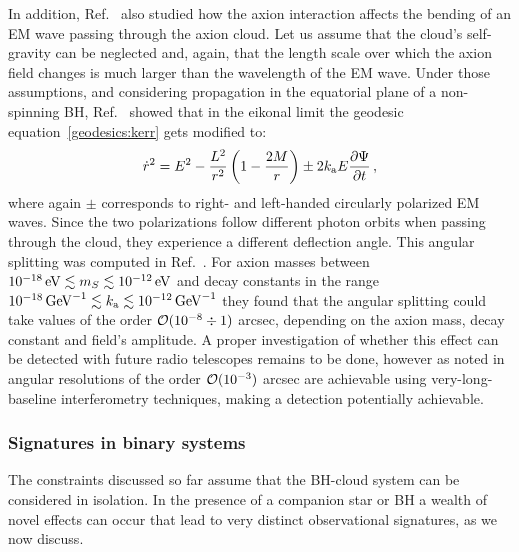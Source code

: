 \documentclass[11pt]{article}
\newcommand{\be}{\begin{equation}}
\newcommand{\ee}{\end{equation}}
\numberwithin{equation}{section} %
\begin{document}
In addition, Ref.~\cite{Plascencia:2017kca} also studied how the axion interaction affects the bending of an EM wave passing through the axion cloud. Let us assume that the cloud's self-gravity can be neglected and, again, that the length scale over which the axion field changes is much larger than the wavelength of the EM wave. Under those assumptions, and considering propagation in the equatorial plane of a non-spinning BH, Ref.~\cite{Plascencia:2017kca} showed that in the eikonal limit the geodesic equation~\eqref{geodesics:kerr} gets modified to: 
%
\be
\dot{r}^2=E^2-\frac{L^2}{r^2}\left(1-\frac{2M}{r} \right) \pm 2 k_{\rm a}E\frac{\partial \Psi}{\partial t}\,,
\ee
%
where again $\pm$ corresponds to right- and left-handed circularly polarized EM waves. Since the two polarizations follow different photon orbits when passing through the cloud, they experience a different deflection angle. This angular splitting was computed in Ref.~\cite{Plascencia:2017kca}. For axion masses between $10^{-18}\,{\rm eV} \lesssim m_S\lesssim 10^{-12}\,{\rm eV}$ and decay constants in the range $10^{-18}\,{\rm GeV}^{-1}\lesssim k_{\rm a} \lesssim 10^{-12}\,{\rm GeV}^{-1}$ they found that the angular splitting could take values of the order ${\cal O}(10^{-8} \div 1)$ arcsec, depending on the axion mass, decay constant and field's amplitude. A proper investigation of whether this effect can be detected with future radio telescopes remains to be done, however as noted in~\cite{Plascencia:2017kca} angular resolutions of the order ${\cal O}(10^{-3})$ arcsec are achievable using very-long-baseline interferometry techniques, making a detection potentially achievable.

\subsubsection{Signatures in binary systems}
The constraints discussed so far assume that the BH-cloud system can be considered in isolation. In the presence of a companion star or BH a wealth of novel effects can occur that lead to very distinct observational signatures, as we now discuss. 
\end{document}
